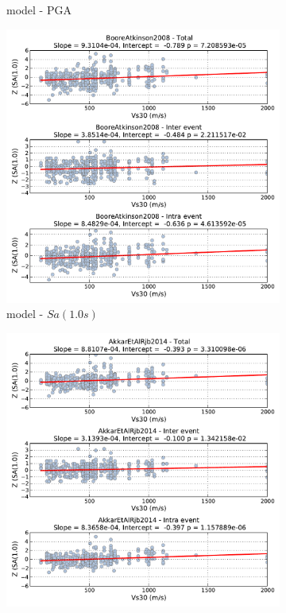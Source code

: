 \begin{figure}[htb]
\begin{subfigure}[b]{0.49\textwidth}
      \caption{\cite{Akkar_etal2014} model - PGA}
      \label{fig:pga_vs30_akkar2014}
  \end{subfigure}
    \begin{subfigure}[b]{0.49\textwidth}
      \includegraphics[width=\textwidth]{./figures/residuals/BA2008_Vs30_Sa1.pdf}
      \caption{\cite{boore2008} model - $Sa \left( {1.0 s} \right)$}
      \label{fig:sa1_vs30_ba2008}
  \end{subfigure}
      \begin{subfigure}[b]{0.49\textwidth}
      \includegraphics[width=\textwidth]{./figures/residuals/Akkar2014_Vs30_Sa1.pdf}

\end{subfigure}
\end{figure}
